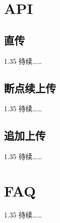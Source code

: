 \documentclass[11pt, oneside]{book}
\newcommand{\qpara}[1]{
\vspace{0.4em}
\begin{spacing}{1.35}
\noindent
#1\par
\end{spacing}
\vspace{0.4em}
}
\begin{document}
\chapter{API}

\section{直传}

\qpara{待续……}

\section{断点续上传}

\qpara{待续……}

\section{追加上传}

\qpara{待续……}

\chapter{FAQ}

\qpara{待续……}
\end{document}
